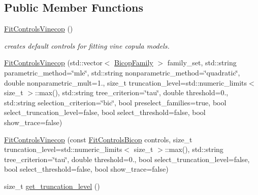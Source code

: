 \subsection*{Public Member Functions}
\begin{DoxyCompactItemize}
\item 
\hyperlink{classvinecopulib_1_1_fit_controls_vinecop_ad101d135c8d8fe66046d931947f45bef}{Fit\+Controls\+Vinecop} ()\hypertarget{classvinecopulib_1_1_fit_controls_vinecop_ad101d135c8d8fe66046d931947f45bef}{}\label{classvinecopulib_1_1_fit_controls_vinecop_ad101d135c8d8fe66046d931947f45bef}

\begin{DoxyCompactList}\small\item\em creates default controls for fitting vine copula models. \end{DoxyCompactList}\item 
\hyperlink{classvinecopulib_1_1_fit_controls_vinecop_af0550d369be595665d0d9e8f6709a74c}{Fit\+Controls\+Vinecop} (std\+::vector$<$ \hyperlink{namespacevinecopulib_a42e95cc06d33896199caab0c11ad44f3}{Bicop\+Family} $>$ family\+\_\+set, std\+::string parametric\+\_\+method=\char`\"{}mle\char`\"{}, std\+::string nonparametric\+\_\+method=\char`\"{}quadratic\char`\"{}, double nonparametric\+\_\+mult=1., size\+\_\+t truncation\+\_\+level=std\+::numeric\+\_\+limits$<$ size\+\_\+t $>$\+::max(), std\+::string tree\+\_\+criterion=\char`\"{}tau\char`\"{}, double threshold=0., std\+::string selection\+\_\+criterion=\char`\"{}bic\char`\"{}, bool preselect\+\_\+families=true, bool select\+\_\+truncation\+\_\+level=false, bool select\+\_\+threshold=false, bool show\+\_\+trace=false)
\item 
\hyperlink{classvinecopulib_1_1_fit_controls_vinecop_a21e1351edcb735b959342384f3dae212}{Fit\+Controls\+Vinecop} (const \hyperlink{classvinecopulib_1_1_fit_controls_bicop}{Fit\+Controls\+Bicop} controls, size\+\_\+t truncation\+\_\+level=std\+::numeric\+\_\+limits$<$ size\+\_\+t $>$\+::max(), std\+::string tree\+\_\+criterion=\char`\"{}tau\char`\"{}, double threshold=0., bool select\+\_\+truncation\+\_\+level=false, bool select\+\_\+threshold=false, bool show\+\_\+trace=false)
\end{DoxyCompactItemize}
{\bf }\par
\begin{DoxyCompactItemize}
\item 
size\+\_\+t \hyperlink{classvinecopulib_1_1_fit_controls_vinecop_afa52dd1f64f6a89ba59ad80374c268a0}{get\+\_\+truncation\+\_\+level} ()
\end{DoxyCompactItemize}



